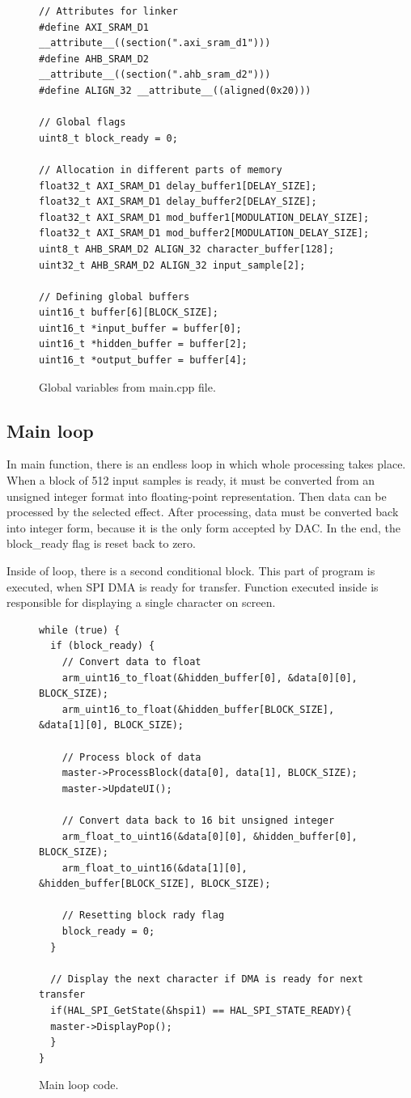 \documentclass[a4paper,twoside,12pt]{book}
\begin{document}
\begin{figure}[H]
\centering
\begin{lstlisting}
// Attributes for linker
#define AXI_SRAM_D1 __attribute__((section(".axi_sram_d1")))
#define AHB_SRAM_D2 __attribute__((section(".ahb_sram_d2")))
#define ALIGN_32 __attribute__((aligned(0x20)))

// Global flags
uint8_t block_ready = 0;

// Allocation in different parts of memory
float32_t AXI_SRAM_D1 delay_buffer1[DELAY_SIZE];
float32_t AXI_SRAM_D1 delay_buffer2[DELAY_SIZE];
float32_t AXI_SRAM_D1 mod_buffer1[MODULATION_DELAY_SIZE];
float32_t AXI_SRAM_D1 mod_buffer2[MODULATION_DELAY_SIZE];
uint8_t AHB_SRAM_D2 ALIGN_32 character_buffer[128];
uint32_t AHB_SRAM_D2 ALIGN_32 input_sample[2];

// Defining global buffers
uint16_t buffer[6][BLOCK_SIZE];
uint16_t *input_buffer = buffer[0];
uint16_t *hidden_buffer = buffer[2];
uint16_t *output_buffer = buffer[4];
\end{lstlisting}
\caption{Global variables from main.cpp file.}
\label{fig:vars}
\end{figure}

\subsection{Main loop}
In main function, there is an endless loop in which whole processing takes place.
When a block of 512 input samples is ready, it must be converted from an unsigned integer
format into floating-point representation.
Then data can be processed by the selected effect.
After processing, data must be converted back into integer form, because
it is the only form accepted by DAC.
In the end, the block\_ready flag is reset back to zero.

Inside of loop, there is a second conditional block.
This part of program is executed, when SPI DMA is ready for transfer.
Function executed inside is responsible for displaying a single character on screen.

\begin{figure}[H]
\centering
\begin{lstlisting}
while (true) {
  if (block_ready) {
    // Convert data to float
    arm_uint16_to_float(&hidden_buffer[0], &data[0][0], BLOCK_SIZE);
    arm_uint16_to_float(&hidden_buffer[BLOCK_SIZE], &data[1][0], BLOCK_SIZE);

    // Process block of data
    master->ProcessBlock(data[0], data[1], BLOCK_SIZE);
    master->UpdateUI();

    // Convert data back to 16 bit unsigned integer
    arm_float_to_uint16(&data[0][0], &hidden_buffer[0], BLOCK_SIZE);
    arm_float_to_uint16(&data[1][0], &hidden_buffer[BLOCK_SIZE], BLOCK_SIZE);

    // Resetting block rady flag
    block_ready = 0;
  }

  // Display the next character if DMA is ready for next transfer
  if(HAL_SPI_GetState(&hspi1) == HAL_SPI_STATE_READY){
  master->DisplayPop();
  }
}
\end{lstlisting}
\caption{Main loop code.}
\label{fig:loop}
\end{figure}
\end{document}
